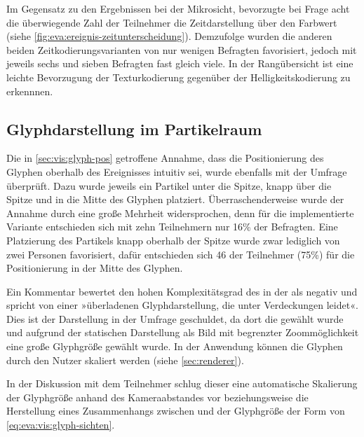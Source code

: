 Im Gegensatz zu den Ergebnissen bei der Mikrosicht, bevorzugte bei Frage acht die überwiegende Zahl der Teilnehmer die Zeitdarstellung über den Farbwert (siehe \autoref{fig:eva:ereignis-zeitunterscheidung}). Demzufolge wurden die anderen beiden Zeitkodierungsvarianten von nur wenigen Befragten favorisiert, jedoch mit jeweils sechs und sieben Befragten fast gleich viele. In der Rangübersicht ist eine leichte Bevorzugung der Texturkodierung gegenüber der Helligkeitskodierung zu erkennnen.


\subsection*{Glyphdarstellung im Partikelraum}\label{sec:eva:glyphdarstellung}

Die in \autoref{sec:vis:glyph-pos} getroffene Annahme, dass die Positionierung des Glyphen oberhalb des Ereignisses intuitiv sei, wurde ebenfalls mit der Umfrage überprüft. Dazu wurde jeweils ein Partikel unter die Spitze, knapp über die Spitze und in die Mitte des Glyphen platziert. Überraschenderweise wurde der Annahme durch eine große Mehrheit widersprochen, denn für die implementierte Variante entschieden sich mit zehn Teilnehmern nur 16\% der Befragten. Eine Platzierung des Partikels knapp oberhalb der Spitze wurde zwar lediglich von zwei Personen favorisiert, dafür entschieden sich 46 der Teilnehmer (75\%) für die Positionierung in der Mitte des Glyphen.


Ein Kommentar bewertet den hohen Komplexitätsgrad des  in der  als negativ und spricht von einer »überladenen Glyphdarstellung, die unter Verdeckungen leidet«. Dies ist der Darstellung in der Umfrage geschuldet, da dort die  gewählt wurde und aufgrund der statischen Darstellung als Bild mit begrenzter Zoommöglichkeit eine große Glyphgröße gewählt wurde. In der Anwendung können die Glyphen durch den Nutzer skaliert werden (siehe \autoref{sec:renderer}).

In der Diskussion mit dem Teilnehmer schlug dieser eine automatische Skalierung der Glyphgröße  anhand des Kameraabstandes vor beziehungsweise die Herstellung eines Zusammenhangs zwischen  und der Glyphgröße der Form von \autoref{eq:eva:vis:glyph-sichten}.

